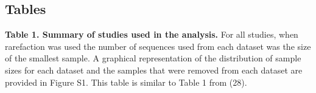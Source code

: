 \documentclass[
]{article}
\begin{document}

\setlength{\parindent}{0in}
\setlength{\leftskip}{0in}

\newpage

\hypertarget{tables}{%
\subsection{Tables}\label{tables}}

\textbf{Table 1. Summary of studies used in the analysis.} For all
studies, when rarefaction was used the number of sequences used from
each dataset was the size of the smallest sample. A graphical
representation of the distribution of sample sizes for each dataset and
the samples that were removed from each dataset are provided in Figure
S1. This table is similar to Table 1 from (28).

\footnotesize
\end{document}
